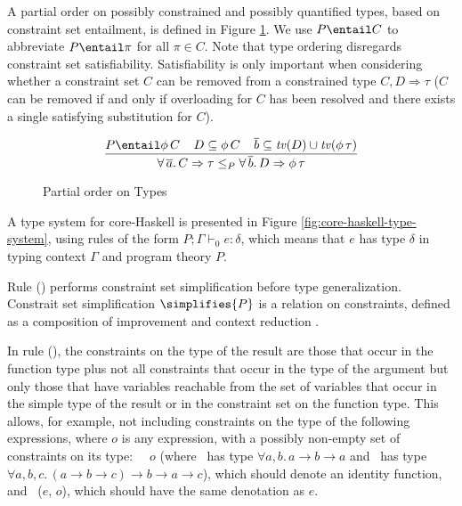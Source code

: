 A partial order on possibly constrained and possibly quantified types,
based on constraint set entailment, is defined in Figure
\ref{fig:type-partial-order}. We use $P \entail C$ to abbreviate
$P\entail \pi$ for all $\pi\in C$.  Note that type ordering disregards
constraint set satisfiability.  Satisfiability is only important when
considering whether a constraint set $C$ can be removed from a
constrained type $C,D \Rightarrow \tau$ ($C$ can be removed if and
only if overloading for $C$ has been resolved and there exists a
single satisfying substitution for
$C$)\cite{JBCS-Ambiguity-and-constrained-polymorphism}.

\begin{figure}
   \[ \begin{array}{ccc}
   	\displaystyle\frac
          {P \entail \phi\,C \:\:\:\:\: D \subseteq \phi\,C \:\:\:\:\: \overline{b} \subseteq \tv(D) \cup \tv(\phi\,\tau) }
          {\forall\,\overline{a}.\,C \Rightarrow \tau \leq_P \forall\,\overline{b}.\,D \Rightarrow \phi\,\tau}
  \end{array} \]
\caption{Partial order on Types}
\label{fig:type-partial-order}
\end{figure}

A type system for core-Haskell is presented in Figure
\ref{fig:core-haskell-type-system}, using rules of the form $P;\Gamma
\vdash_0 e:\delta$, which means that $e$ has type $\delta$ in typing
context $\Gamma$ and program theory $P$.

Rule (\LET) performs constraint set simplification before type
generalization. Constrait set simplification $\simplifies{P}$ is a
relation on cons\-traints, defined as a composition of improvement and
context reduction \cite{JBCS-Ambiguity-and-constrained-polymorphism}.

In rule (\APP), the constraints on the type of the result are those
that occur in the function type plus not all constraints that occur in
the type of the argument but only those that have variables reachable
from the set of variables that occur in the simple type of the result
or in the constraint set on the function type.  This allows, for
example, not including constraints on the type of the following
expressions, where $o$ is any expression, with a possibly non-empty
set of constraints on its type: {\tt \flip\ \const\ $o$} (where
\const\ has type $\forall a, b.\,a \rightarrow b \rightarrow a$ and
\flip\ has type $\forall a, b, c.\,(a \rightarrow b \rightarrow c)
\rightarrow b \rightarrow a\rightarrow c$), which should denote an
identity function, and \fst\ ($e$, $o$), which should have the same
denotation as $e$.

